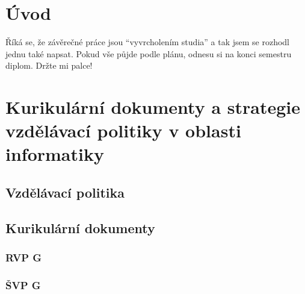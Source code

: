 \documentclass[
  digital,     %
  oneside,     %
  nosansbold,  %
  nocolorbold, %
  lof,         %
  lot,         %
]{fithesis4}
\begin{document}

\chapter*{Úvod}

Říká se, že závěrečné práce jsou \enquote{vyvrcholením studia}
a tak jsem se rozhodl jednu také napsat. Pokud vše půjde podle
plánu, odnesu si na konci semestru diplom. Držte mi palce!

\chapter{Kurikulární dokumenty a strategie vzdělávací politiky v oblasti informatiky}

\section{Vzdělávací politika}

\section{Kurikulární dokumenty}
\subsection{RVP G}
\subsection{ŠVP G}
\end{document}
